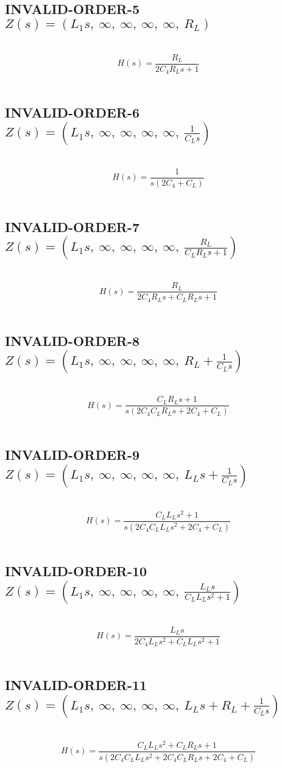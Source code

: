 \documentclass{article}
\begin{document}
\subsection{INVALID-ORDER-5 $Z(s) = \left( L_{1} s, \  \infty, \  \infty, \  \infty, \  \infty, \  R_{L}\right)$ } \ 
\textbf{\[H(s) = \frac{R_{L}}{2 C_{4} R_{L} s + 1}\] } \ 
\subsection{INVALID-ORDER-6 $Z(s) = \left( L_{1} s, \  \infty, \  \infty, \  \infty, \  \infty, \  \frac{1}{C_{L} s}\right)$ } \ 
\textbf{\[H(s) = \frac{1}{s \left(2 C_{4} + C_{L}\right)}\] } \ 
\subsection{INVALID-ORDER-7 $Z(s) = \left( L_{1} s, \  \infty, \  \infty, \  \infty, \  \infty, \  \frac{R_{L}}{C_{L} R_{L} s + 1}\right)$ } \ 
\textbf{\[H(s) = \frac{R_{L}}{2 C_{4} R_{L} s + C_{L} R_{L} s + 1}\] } \ 
\subsection{INVALID-ORDER-8 $Z(s) = \left( L_{1} s, \  \infty, \  \infty, \  \infty, \  \infty, \  R_{L} + \frac{1}{C_{L} s}\right)$ } \ 
\textbf{\[H(s) = \frac{C_{L} R_{L} s + 1}{s \left(2 C_{4} C_{L} R_{L} s + 2 C_{4} + C_{L}\right)}\] } \ 
\subsection{INVALID-ORDER-9 $Z(s) = \left( L_{1} s, \  \infty, \  \infty, \  \infty, \  \infty, \  L_{L} s + \frac{1}{C_{L} s}\right)$ } \ 
\textbf{\[H(s) = \frac{C_{L} L_{L} s^{2} + 1}{s \left(2 C_{4} C_{L} L_{L} s^{2} + 2 C_{4} + C_{L}\right)}\] } \ 
\subsection{INVALID-ORDER-10 $Z(s) = \left( L_{1} s, \  \infty, \  \infty, \  \infty, \  \infty, \  \frac{L_{L} s}{C_{L} L_{L} s^{2} + 1}\right)$ } \ 
\textbf{\[H(s) = \frac{L_{L} s}{2 C_{4} L_{L} s^{2} + C_{L} L_{L} s^{2} + 1}\] } \ 
\subsection{INVALID-ORDER-11 $Z(s) = \left( L_{1} s, \  \infty, \  \infty, \  \infty, \  \infty, \  L_{L} s + R_{L} + \frac{1}{C_{L} s}\right)$ } \ 
\textbf{\[H(s) = \frac{C_{L} L_{L} s^{2} + C_{L} R_{L} s + 1}{s \left(2 C_{4} C_{L} L_{L} s^{2} + 2 C_{4} C_{L} R_{L} s + 2 C_{4} + C_{L}\right)}\] } \ 
\end{document}
